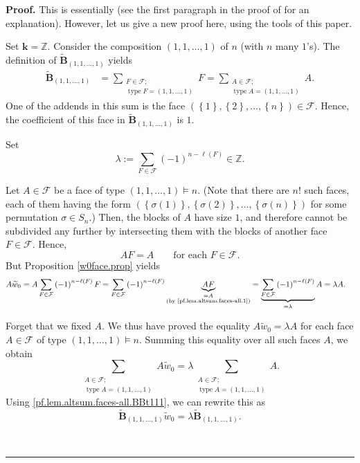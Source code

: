 \documentclass[12pt]{article}
\theoremstyle{definition}%
\theoremstyle{definition}%
\theoremstyle{remark}%
\newcommand{\tup}[1]{\left( #1 \right)}
\newcommand{\set}[1]{\left\{ #1 \right\}}
\newcommand{\ZZ}{\mathbb{Z}}
\newcommand{\kk}{\mathbf{k}}
\newcommand{\BBt}{\widetilde{\mathbf{B}}}
\newcommand{\CF}{\mathcal{F}}
\newcommand{\wotil}{\widetilde{w}_0}
\newcommand{\type}{\operatorname{type}}
\newenvironment{proof}[1][Proof]{\noindent\textbf{#1.} }{\ \rule{0.5em}{0.5em}}
\begin{document}
\begin{proof}
This is essentially \cite[Theorem 2.2.2]{Sag20} (see the first paragraph in the proof of \cite[Theorem 2.2.2]{Sag20} for an explanation).
However, let us give a new proof here, using the tools of this paper.

Set $\kk = \ZZ$.
Consider the composition $\tup{1, 1, \ldots, 1}$
of $n$ (with $n$ many $1$'s).
The definition of $\BBt_{\tup{1, 1, \ldots, 1}}$
yields
\begin{align}
\BBt_{\tup{1, 1, \ldots, 1}}
&= \sum_{\substack{F\in \CF;\\
\type F=\tup{1, 1, \ldots, 1}}} F
= \sum_{\substack{A\in \CF;\\
\type A=\tup{1, 1, \ldots, 1}}} A.
\label{pf.lem.altsum.faces-all.BBt111}
\end{align}
One of the addends in this sum is the face
$\tup{\set{1}, \set{2}, \ldots, \set{n}} \in \CF$.
Hence, the coefficient of this face in
$\BBt_{\tup{1, 1, \ldots, 1}}$ is $1$.

Set
\begin{equation}
\lambda := \sum_{F\in\CF} \tup{-1}^{n-\ell \tup{F}}
\in \ZZ.
\label{pf.lem.altsum.faces-all.0}
\end{equation}


Let $A\in\CF$ be a face of type $\tup{1, 1, \ldots, 1}\models
n$. (Note that there are $n!$ such faces, each of them having the form
$\tup{ \set{\sigma\tup{1}}, \set{\sigma\tup{2}},
\ldots, \set{\sigma\tup{n}} }$
for some permutation $\sigma\in S_n$.)
Then, the blocks of $A$ have size $1$, and therefore
cannot be subdivided any further by intersecting
them with the blocks of another face $F\in\CF$. Hence,
\begin{equation}
AF = A \qquad \text{for each } F\in\CF .
\label{pf.lem.altsum.faces-all.1}
\end{equation}
But Proposition \ref{w0face.prop} yields
\begin{align*}
A\wotil
&= A\sum_{F\in\CF} \tup{-1}^{n-\ell\tup{F} }F
= \sum_{F\in\CF} \tup{-1}^{n-\ell\tup{F} }
\underbrace{AF}_{\substack{=A\\
\text{(by \eqref{pf.lem.altsum.faces-all.1})}}}
= \underbrace{\sum_{F\in\CF}
\tup{-1}^{n-\ell\tup{F} }}_{=\lambda}A
= \lambda A.
\end{align*}


Forget that we fixed $A$. We thus have proved the equality
$A\wotil = \lambda A$ for each face
$A\in\CF$ of type $\tup{1, 1, \ldots, 1}\models n$.
Summing this equality over all such faces $A$, we obtain
\begin{equation}
\sum_{\substack{A\in\CF;\\\type A= \tup{1,1,\ldots,1}
}} A\wotil
= \lambda\sum_{\substack{A\in\CF;\\
\type A=\tup{1, 1, \ldots, 1}}
}A.
\end{equation}
Using \eqref{pf.lem.altsum.faces-all.BBt111}, we can rewrite 
this as
\[
\BBt_{\tup{1, 1, \ldots, 1}}
\wotil
= \lambda\BBt_{\tup{1, 1, \ldots, 1}}.
\]


\end{proof}
\end{document}
